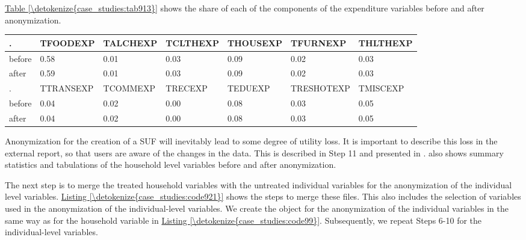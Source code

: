 \documentclass[letterpaper,10pt,english]{sphinxmanual}
\begin{document}
\hyperref[\detokenize{case_studies:tab913}]{Table \ref{\detokenize{case_studies:tab913}}} shows the share of each of the components of the expenditure
variables before and after anonymization.


\begin{savenotes}\sphinxattablestart
\centering
{}
\label{\detokenize{case_studies:tab913}}\label{\detokenize{case_studies:id28}}
\sphinxaftercaption
\begin{tabulary}{\linewidth}[t]{|T|T|T|T|T|T|T|}
\hline
\sphinxstyletheadfamily 
.
&\sphinxstyletheadfamily 
TFOODEXP
&\sphinxstyletheadfamily 
TALCHEXP
&\sphinxstyletheadfamily 
TCLTHEXP
&\sphinxstyletheadfamily 
THOUSEXP
&\sphinxstyletheadfamily 
TFURNEXP
&\sphinxstyletheadfamily 
THLTHEXP
\\
\hline
before
&
0.58
&
0.01
&
0.03
&
0.09
&
0.02
&
0.03
\\
\hline
after
&
0.59
&
0.01
&
0.03
&
0.09
&
0.02
&
0.03
\\
\hline
.
&
TTRANSEXP
&
TCOMMEXP
&
TRECEXP
&
TEDUEXP
&
TRESHOTEXP
&
TMISCEXP
\\
\hline
before
&
0.04
&
0.02
&
0.00
&
0.08
&
0.03
&
0.05
\\
\hline
after
&
0.04
&
0.02
&
0.00
&
0.08
&
0.03
&
0.05
\\
\hline
\end{tabulary}
\par
\sphinxattableend\end{savenotes}

Anonymization for the creation of a SUF will inevitably lead to some
degree of utility loss. It is important to describe this loss in the
external report, so that users are aware of the changes in the data.
This is described in Step 11 and presented in
.
also shows summary statistics and tabulations of the household level
variables before and after anonymization.


The next step is to merge the treated household variables with the
untreated individual variables for the anonymization of the individual
level variables. \hyperref[\detokenize{case_studies:code921}]{Listing \ref{\detokenize{case_studies:code921}}} shows the steps to merge these files. This
also includes the selection of variables used in the anonymization of
the individual-level variables. We create the  object for the
anonymization of the individual variables in the same way as for the
household variable in \hyperref[\detokenize{case_studies:code99}]{Listing \ref{\detokenize{case_studies:code99}}}. Subsequently, we repeat Steps 6-10
for the individual-level variables.
\end{document}
